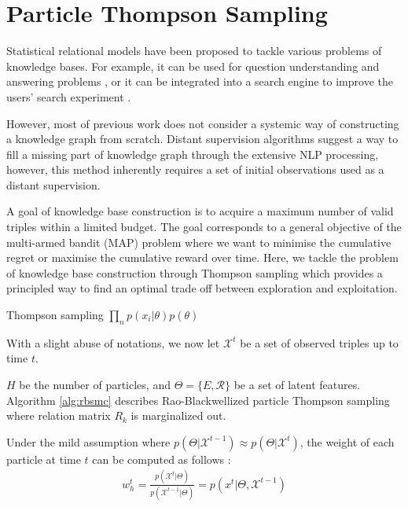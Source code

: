 \section{Particle Thompson Sampling}
Statistical relational models have been proposed to tackle
various problems of knowledge bases. For example, it can be used 
for question understanding and answering problems \cite{Dong2015},
or it can be integrated into a search engine
to improve the users' search experiment \cite{dong2014knowledge}.

However, most of previous work does not consider a systemic way of constructing
a knowledge graph from scratch. Distant supervision algorithms
\cite{Mintz2009} suggest a way to fill a missing part of knowledge graph
through the extensive NLP processing, however, this method inherently
requires a set of initial observations used as a distant supervision.

A goal of knowledge base construction is to acquire a maximum number
of valid triples within a limited budget.
The goal corresponds to a general objective of the multi-armed bandit (MAP)
problem where we want to minimise the cumulative regret or maximise
the cumulative reward over time. Here, we tackle the problem of knowledge 
base construction through Thompson sampling which provides a principled
way to find an optimal trade off between exploration and exploitation.


Thompson sampling 
$\prod_n p(x_i|\theta)p(\theta)$

With a slight abuse of notations, we now let $\mathcal{X}^{t}$ be a set of observed triples up to time $t$.

$H$ be the number of particles, and $\Theta= \{E, \mathcal{R}\}$ be a set of latent features.
Algorithm \ref{alg:rbsmc} describes Rao-Blackwellized particle Thompson sampling where relation matrix $R_k$ is marginalized out.

Under the mild assumption where $p(\Theta | \mathcal{X}^{t-1}) \approx p(\Theta | \mathcal{X}^{t})$, the weight of each particle at time $t$ can be computed as follows \cite{del2006sequential,chopin2002sequential}:
\begin{align}
w_{h}^{t} = \frac{p(\mathcal{X}^{t} | \Theta)}{p(\mathcal{X}^{t-1} | \Theta)} = p(x^{t} | \Theta, \mathcal{X}^{t-1})
\end{align}


